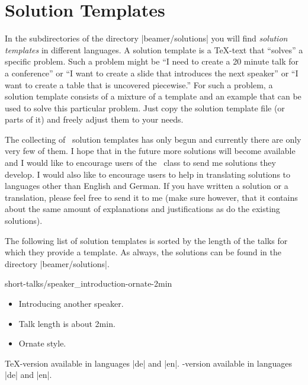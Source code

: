
%


\section{Solution Templates}
\label{section-solutions}

In the subdirectories of the directory |beamer/solutions| you will
find \emph{solution templates} in different languages. A solution
template is a \TeX-text that ``solves'' a specific problem. Such a
problem might be ``I need to create a 20 minute talk for a
conference'' or ``I want to create a slide that introduces the next
speaker'' or ``I want to create a table that is uncovered piecewise.''
For such a problem, a solution template consists of a mixture of a
template and an example that can be used to solve this particular
problem. Just copy the solution template file (or parts of it) and
freely adjust them to your needs.  

The collecting of \beamer\ solution templates has only begun and
currently there are only very few of them. I hope that in the future
more solutions will become available and I would like to encourage
users of the \beamer\ class to send me solutions they develop. I would
also like to encourage users to help in translating solutions to
languages other than English and German. If you have written a
solution or a translation, please feel free to send it to me (make
sure however, that it contains about the same amount of explanations
and justifications as do the existing solutions).

The following list of solution templates is sorted by the length of
the talks for which they provide a template. As always, the solutions
can be found in the directory |beamer/solutions|.


\begin{solution}{short-talks/speaker\_introduction-ornate-2min}
  \begin{itemize}
  \item
    Introducing another speaker.
  \item
    Talk length is about 2min.
  \item
    Ornate style.
  \end{itemize}
  \beamernote \TeX-version available in languages |de| and |en|.
  \lyxnote    \LyX-version available in languages |de| and |en|.
\end{solution}

